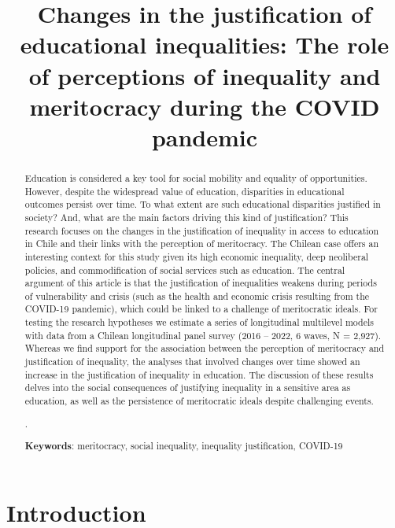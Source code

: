 \documentclass[
  12pt,
  a4paper,
]{article}
\title{Changes in the justification of educational inequalities: The
role of perceptions of inequality and meritocracy during the COVID
pandemic}
\author{}
\date{\vspace{-2.5em}}
\begin{document}
\maketitle
\begin{abstract}
Education is considered a key tool for social mobility and equality of
opportunities. However, despite the widespread value of education,
disparities in educational outcomes persist over time. To what extent
are such educational disparities justified in society? And, what are the
main factors driving this kind of justification? This research focuses
on the changes in the justification of inequality in access to education
in Chile and their links with the perception of meritocracy. The Chilean
case offers an interesting context for this study given its high
economic inequality, deep neoliberal policies, and commodification of
social services such as education. The central argument of this article
is that the justification of inequalities weakens during periods of
vulnerability and crisis (such as the health and economic crisis
resulting from the COVID-19 pandemic), which could be linked to a
challenge of meritocratic ideals. For testing the research hypotheses we
estimate a series of longitudinal multilevel models with data from a
Chilean longitudinal panel survey (2016 -- 2022, 6 waves, N = 2,927).
Whereas we find support for the association between the perception of
meritocracy and justification of inequality, the analyses that involved
changes over time showed an increase in the justification of inequality
in education. The discussion of these results delves into the social
consequences of justifying inequality in a sensitive area as education,
as well as the persistence of meritocratic ideals despite challenging
events.

. \newline \newline

\textbf{Keywords}: meritocracy, social inequality, inequality
justification, COVID-19
\end{abstract}

\pagebreak

\hypertarget{introduction}{%
\section{Introduction}\label{introduction}}
\end{document}
